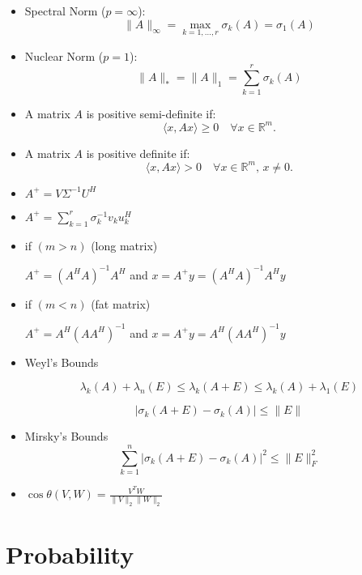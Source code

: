 \documentclass{article}
\begin{document}
\begin{itemize}
        \item Spectral Norm ($p = \infty$):
        \[
        \|A\|_\infty = \max_{k=1,\ldots,r} \sigma_k(A) = \sigma_1(A)
        \]

        \item Nuclear Norm ($p = 1$):
        \[
        \|A\|_* = \|A\|_1 = \sum_{k=1}^r \sigma_k(A)
        \]

\item A matrix $A$ is positive semi-definite if:
        \[
        \langle x, Ax \rangle \geq 0 \quad \forall x \in \mathbb{R}^m.
        \]

 \item A matrix $A$ is positive definite if:
        \[
        \langle x, Ax \rangle > 0 \quad \forall x \in \mathbb{R}^m, \, x \neq 0.
        \]



\item 
   $
    A^+ = V \Sigma^{-1} U^H
   $


\item 
$
A^+ = \sum_{k=1}^{r} \sigma_k^{-1} v_k u_k^H
$


\item if $(m > n)$ (long matrix)

    $
    A^+ = (A^H A)^{-1} A^H
    $ and $x = A^+y = (A^H A)^{-1} A^Hy$

\item if $(m < n)$ (fat matrix)

$
 A^+ = A^H(AA^H)^{-1}
$ and $x = A^+y = A^H(AA^H)^{-1}y$

\item Weyl's Bounds

\[
\lambda_k(A) + \lambda_n(E) \leq \lambda_k(A + E) \leq \lambda_k(A) + \lambda_1(E)
\]

\[
\lvert \sigma_k(A + E) - \sigma_k(A) \rvert \leq \lVert E \rVert
\]


\item Mirsky's Bounds
\[
\sum_{k=1}^{n} \lvert \sigma_k(A + E) - \sigma_k(A) \rvert^2 \leq \lVert E \rVert_F^2
\]

\item   $
    \cos \theta(V,W) = \frac{V^T W}{\lVert V \rVert_2 \lVert W \rVert_2}
    $

\end{itemize}


\section{Probability}
\end{document}
